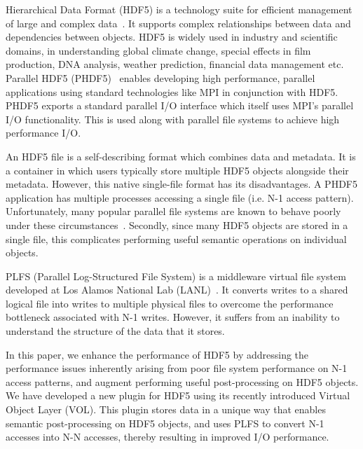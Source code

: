 Hierarchical Data Format (HDF5) is a technology suite for efficient management of large and complex data~\cite{hdf5_ad11}. It supports complex relationships between data and dependencies between objects. HDF5 is widely used in industry and scientific domains, in understanding global climate change, special effects in film production, DNA analysis, weather prediction, financial data management etc.~\cite{hdf5_users}
Parallel HDF5 (PHDF5)~\cite{phdf5} enables developing high performance, parallel applications using standard technologies like MPI in conjunction with HDF5. 
PHDF5 exports a standard parallel I/O interface which itself uses MPI's parallel I/O functionality. This is used along with parallel file systems to achieve high performance I/O.

An HDF5 file is a self-describing format which combines data and metadata. It is a container in which users typically store multiple HDF5 objects alongside their metadata. 
However, this native single-file format has its disadvantages. A PHDF5 application has multiple processes accessing a single file (i.e. N-1 access pattern). Unfortunately, many popular parallel file systems are known to behave poorly under these circumstances~\cite{lustre_perf,nersc_io}. Secondly, since many HDF5 objects are stored in a single file, this complicates performing useful semantic operations on individual objects.  

PLFS (Parallel Log-Structured File System) is a middleware virtual file system developed at Los Alamos National Lab (LANL)~\cite{plfs_sc09}. It converts writes to a shared logical file into writes to multiple physical files to overcome the performance bottleneck associated with N-1 writes. However, it suffers from an inability to understand the structure of the data that it stores.

In this paper, we enhance the performance of HDF5 by addressing the performance issues inherently arising from poor file system performance on N-1 access patterns, and augment performing  useful post-processing on HDF5 objects.
We have developed a new plugin for HDF5 using its recently introduced Virtual Object Layer (VOL).  
This plugin stores data in a unique way that enables semantic post-processing on HDF5 objects, and uses PLFS to convert N-1 accesses into N-N accesses, thereby resulting in improved I/O performance.


